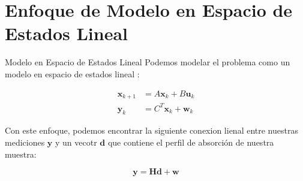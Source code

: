 \documentclass[aspectratio=169,xcolor=dvipsnames]{beamer}
\begin{document}
\section{Enfoque de Modelo en Espacio de Estados Lineal}

\begin{frame}{Modelo en Espacio de Estados Lineal}
    Podemos modelar el problema como un modelo en espacio de estados lineal \cite{Lang}:

    \begin{equation}
        \begin{aligned}
            \mathbf{x}_{k+1} &= A \mathbf{x}_k + B \mathbf{u}_k \\
            \mathbf{y}_k &= C^{T} \mathbf{x}_k + \mathbf{w}_k
        \end{aligned}
    \end{equation}

    Con este enfoque, podemos encontrar la siguiente conexion lienal entre nuestras mediciones $\mathbf{y}$ y un vecotr $\mathbf{d}$ que contiene el perfil de absorción de nuestra muestra:
    
        \begin{equation} \label{eq:problem}
            \mathbf{y} = \mathbf{H} \mathbf{d} + \mathbf{w}
        \end{equation} 

\end{frame}



\end{document}
